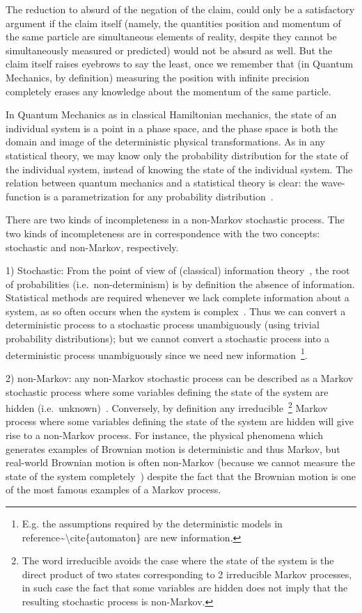 \documentclass[11pt]{book}
\begin{document}
The reduction to absurd of the negation of the claim, could only be a
satisfactory argument if the claim itself (namely, the quantities
position and momentum of the same particle are simultaneous elements of
reality, despite they cannot be simultaneously measured or predicted)
would not be absurd as well. But the claim itself raises eyebrows to say
the least, once we remember that (in Quantum Mechanics, by definition)
measuring the position with infinite precision completely erases any
knowledge about the momentum of the same particle.

In Quantum Mechanics as in classical Hamiltonian mechanics, the state of
an individual system is a point in a phase space, and the phase space is
both the domain and image of the deterministic physical transformations.
As in any statistical theory, we may know only the probability
distribution for the state of the individual system, instead of knowing
the state of the individual system. The relation between quantum
mechanics and a statistical theory is clear: the wave-function is a
parametrization for any probability
distribution~\cite{Pedro2017Relating}.

There are two kinds of incompleteness in a non-Markov stochastic
process. The two kinds of incompleteness are in correspondence with the
two concepts: stochastic and non-Markov, respectively.

1) Stochastic: From the point of view of (classical) information
theory~\cite{Shannon1948mathematical},
the root of probabilities (i.e.~non-determinism) is by definition the
absence of information. Statistical methods are required whenever we
lack complete information about a system, as so often occurs when the
system is complex~\cite{Bertin2016Statistical}. Thus we can convert a deterministic process to a stochastic
process unambiguously (using trivial probability distributions); but we
cannot convert a stochastic process into a deterministic process
unambiguously since we need new information~\footnote{E.g. the
  assumptions required by the deterministic models in
  reference\textasciitilde\textbackslash cite\{automaton\} are new
  information.}.

2) non-Markov: any non-Markov stochastic process can be described as a
Markov stochastic process where some variables defining the state of the
system are hidden
(i.e.~unknown)~\cite{Zuckerman2015Statistical}\cite{Kampen1998Remarks}.
Conversely, by definition any irreducible~\footnote{The word irreducible
  avoids the case where the state of the system is the direct product of
  two states corresponding to 2 irreducible Markov processes, in such
  case the fact that some variables are hidden does not imply that the
  resulting stochastic process is non-Markov.} Markov process where some
variables defining the state of the system are hidden will give rise to
a non-Markov process. For instance, the physical phenomena which
generates examples of Brownian motion is deterministic and thus Markov,
but real-world Brownian motion is often non-Markov (because we cannot
measure the state of the system
completely~\cite{Franosch2011Resonances}\cite{Bolivar2011Non})
despite the fact that the Brownian motion is one of the most famous
examples of a Markov process.
\end{document}
